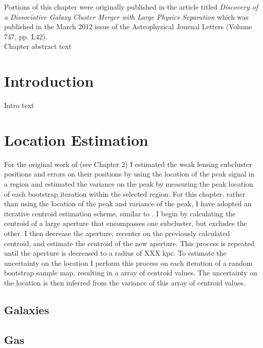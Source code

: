\label{chapter:4}

\noindent Portions of this chapter were originally published in the article titled \emph{Discovery of a Dissociative Galaxy Cluster Merger with Large Physics Separation} which was published in the March 2012 issue of the Astrophysical Journal Letters (Volume 747, pp. L42). \\

Chapter abstract text

\section{Introduction}



Intro text \citep{Dawson:2012dl}

\section{Location Estimation}
For the original work of \citet{Dawson:2012dl} (see Chapter 2) I estimated the weak lensing subcluster positions and errors on their positions by using the location of the peak signal in a region and estimated the variance on the peak by measuring the peak location of each bootstrap iteration within the selected region.  
For this chapter, rather than using the location of the peak and variance of the peak, I have adopted an iterative centroid estimation scheme, similar to \citet{Randall:2008hs}. 
I begin by calculating the centroid of a large aperture that encompasses one subcluster, but excludes the other.
I then decrease the aperture, recenter on the previously calculated centroid, and estimate the centroid of the new aperture.
This process is repeated until the aperture is decreased to a radius of XXX kpc.
To estimate the uncertainty on the location I perform this process on each iteration of a random bootstrap sample map, resulting in a array of centroid values.
 The uncertainty on the location is then inferred from the variance of this array of centroid values.


\subsection{Galaxies}
\subsection{Gas}
